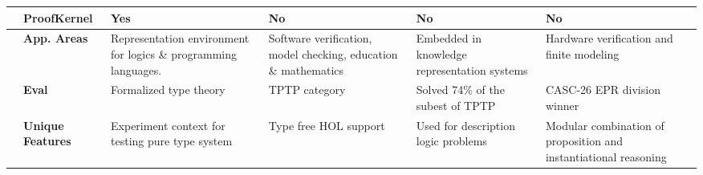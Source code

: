 \begin{table}[ht]
{\begin{tabular}{|p{}|p{}|p{4.2cm}|p{4.2cm}|p{4.2cm}|p{4.2cm}|}
 & \textbf{ProofKernel} & Yes & No & No & No\\ \hline
\parbox[t]{2mm}{} & \textbf{App. Areas} & Representation environment for logics 
\& programming languages. & Software verification, 
       model checking, education \& mathematics & Embedded in knowledge representation systems & Hardware verification and finite modeling\\
 & \textbf{Eval} & Formalized type theory & TPTP category  & Solved 74\% of the subest of TPTP & CASC-26 EPR division winner\\
& \textbf{Unique Features} & Experiment context for testing pure type system & Type free HOL support
 & Used for description logic problems & Modular combination of proposition and instantiational reasoning\\
\hline
\end{tabular}
}
\label{Yarrow}
\end{table}
